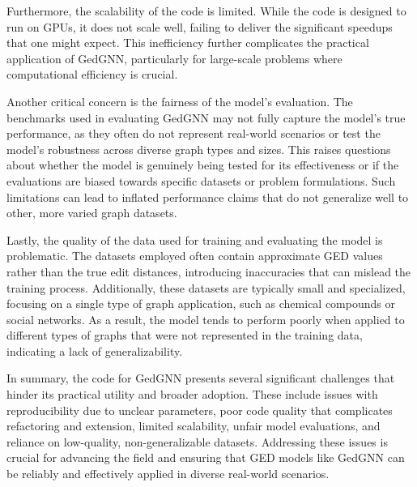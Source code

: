 \documentclass[../Thesis.tex]{subfiles}
\begin{document}
	Furthermore, the scalability of the code is limited. While the code is designed to run on GPUs, it does not scale well, failing to deliver the significant speedups that one might expect. This inefficiency further complicates the practical application of GedGNN, particularly for large-scale problems where computational efficiency is crucial.
	
	Another critical concern is the fairness of the model's evaluation. The benchmarks used in evaluating GedGNN may not fully capture the model's true performance, as they often do not represent real-world scenarios or test the model's robustness across diverse graph types and sizes. This raises questions about whether the model is genuinely being tested for its effectiveness or if the evaluations are biased towards specific datasets or problem formulations. Such limitations can lead to inflated performance claims that do not generalize well to other, more varied graph datasets.
	
	Lastly, the quality of the data used for training and evaluating the model is problematic. The datasets employed often contain approximate GED values rather than the true edit distances, introducing inaccuracies that can mislead the training process. Additionally, these datasets are typically small and specialized, focusing on a single type of graph application, such as chemical compounds or social networks. As a result, the model tends to perform poorly when applied to different types of graphs that were not represented in the training data, indicating a lack of generalizability.
	
	In summary, the code for GedGNN presents several significant challenges that hinder its practical utility and broader adoption. These include issues with reproducibility due to unclear parameters, poor code quality that complicates refactoring and extension, limited scalability, unfair model evaluations, and reliance on low-quality, non-generalizable datasets. Addressing these issues is crucial for advancing the field and ensuring that GED models like GedGNN can be reliably and effectively applied in diverse real-world scenarios.

	
\end{document}
